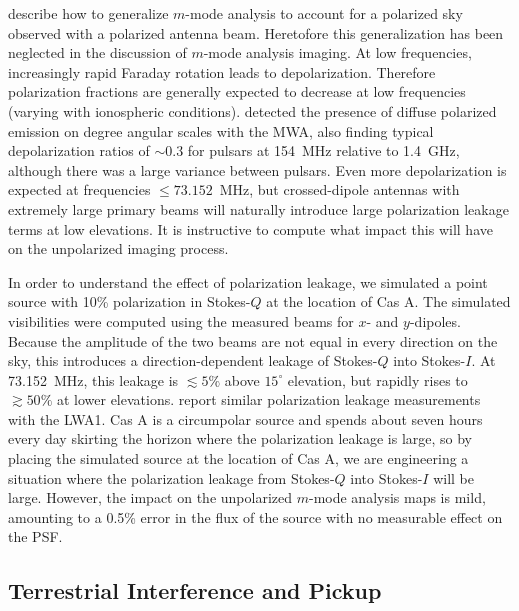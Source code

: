 \documentclass[twocolumn]{aastex61}
\begin{document}
\citet{2015PhRvD..91h3514S} describe how to generalize $m$-mode analysis to account for a polarized
sky observed with a polarized antenna beam. Heretofore this generalization has been neglected in the
discussion of $m$-mode analysis imaging.  At low frequencies, increasingly rapid Faraday rotation
leads to depolarization. Therefore polarization fractions are generally expected to decrease at low
frequencies (varying with ionospheric conditions). \citet{2016ApJ...830...38L} detected the presence
of diffuse polarized emission on degree angular scales with the MWA, also finding typical
depolarization ratios of $\sim0.3$ for pulsars at 154~MHz relative to 1.4~GHz, although there was a
large variance between pulsars. Even more depolarization is expected at frequencies $\le
73.152$~MHz, but crossed-dipole antennas with extremely large primary beams will naturally introduce
large polarization leakage terms at low elevations.  It is instructive to compute what impact this
will have on the unpolarized imaging process.

In order to understand the effect of polarization leakage, we simulated a point source with 10\%
polarization in Stokes-$Q$ at the location of Cas A.  The simulated visibilities were computed using
the measured beams for $x$- and $y$-dipoles. Because the amplitude of the two beams are not equal in
every direction on the sky, this introduces a direction-dependent leakage of Stokes-$Q$ into
Stokes-$I$. At 73.152~MHz, this leakage is $\lesssim5\%$ above $15^\circ$ elevation, but rapidly
rises to $\gtrsim50\%$ at lower elevations. \citet{2015JAI.....450004O} report similar polarization
leakage measurements with the LWA1.  Cas A is a circumpolar source and spends about seven hours
every day skirting the horizon where the polarization leakage is large, so by placing the simulated
source at the location of Cas A, we are engineering a situation where the polarization leakage from
Stokes-$Q$ into Stokes-$I$ will be large. However, the impact on the unpolarized $m$-mode analysis
maps is mild, amounting to a 0.5\% error in the flux of the source with no measurable effect on the
PSF.

\subsection{Terrestrial Interference and Pickup}\label{sec:rfi}
\end{document}
